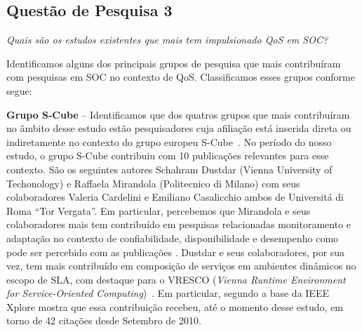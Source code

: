 \subsection{Questão de Pesquisa 3}\label{sec:QP3}

\emph{Quais s\~{a}o os estudos existentes que mais tem impulsionado QoS em SOC?}


Identificamos alguns dos principais grupos de pesquisa que mais contribu\'{i}ram com pesquisas em SOC no contexto de QoS. Classificamos esses grupos conforme segue: 

\textbf{Grupo S-Cube} -- Identificamos que dos quatros grupos que mais contribu\'{i}ram no \^{a}mbito desse estudo est\~{a}o pesquisadores cuja afilia\c{c}\~{a}o est\'{a} inserida direta ou indiretamente no contexto do grupo europeu S-Cube~\cite{SCube}. No per\'{i}odo do nosso estudo, o grupo S-Cube contribuiu com 10 publica\c{c}\~{o}es relevantes para esse contexto. S\~{a}o os seguintes autores Schahram Dustdar (Vienna University of Techonology) e Raffaela Mirandola (Politecnico di Milano) com seus colaboradores Valeria Cardelini e Emiliano Casalicchio ambos de Universit\'{a} di Roma ``Tor Vergata''. Em particular, percebemos que Mirandola e seus colaboradores mais tem contribu\'{i}do em pesquisas relacionadas monitoramento e adapta\c{c}\~{a}o no contexto de confiabilidade, disponibilidade e desempenho como pode ser percebido com as publica\c{c}\~{o}es \cite{Cardellini:2009:QRA:1595696.1595718, Calinescu:2011:DQM:1990772.1991012, Ardagna:2010:POS:1814581.1814611, 10.1109/TSE.2011.68, Cardellini:2009:TSD:1692867.1692870}. Dustdar e seus colaboradores, por sua vez, tem mais contribu\'{i}do em composi\c{c}\~{a}o de servi\c{c}os em ambientes din\^{a}micos no escopo de SLA, com destaque para o  VRESCO (\emph{Vienna Runtime Environment for Service-Oriented Computing})~\cite{5467022}. Em particular, segundo a base da IEEE Xplore mostra que essa contribui\c{c}\~{a}o recebeu, at\'{e} o momento desse estudo, em torno de 42 cita\c{c}\~{o}es desde Setembro de 2010.

